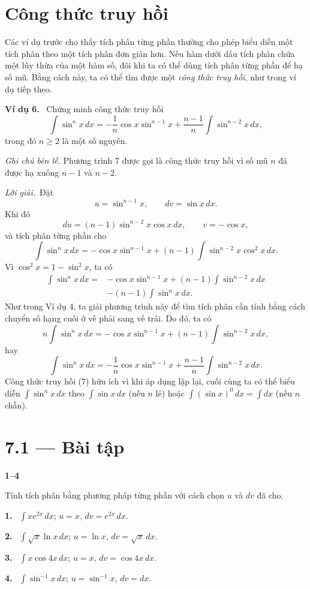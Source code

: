 \documentclass[12pt,a4paper]{article}
\newcommand{\ex}[1]{\par\medskip\noindent\textbf{Ví dụ #1.}\ }
\newcommand{\sol}{\par\nopagebreak[4]\noindent\textit{Lời giải.}\ }
\newcommand{\bt}[1]{\par\smallskip\Needspace{5\baselineskip}\noindent\textbf{#1.}\ }
\newcommand{\group}[1]{\par\Needspace{11\baselineskip}\medskip\noindent\textbf{#1}\par\nopagebreak[4]}
\begin{document}
\section*{Công thức truy hồi}
Các ví dụ trước cho thấy tích phân từng phần thường cho phép biểu diễn một tích phân theo một tích phân đơn giản hơn. Nếu hàm dưới dấu tích phân chứa một lũy thừa của một hàm số, đôi khi ta có thể dùng tích phân từng phần để hạ số mũ. Bằng cách này, ta có thể tìm được một \textit{công thức truy hồi}, như trong ví dụ tiếp theo.

\ex{6} Chứng minh công thức truy hồi
\begin{equation}\int\sin^n x\,dx=-\frac1n\cos x\sin^{n-1}x+\frac{n-1}{n}\int\sin^{n-2}x\,dx,\tag{7}\end{equation}
trong đó $n\ge2$ là một số nguyên.

\textit{Ghi chú bên lề.} Phương trình 7 được gọi là công thức truy hồi vì số mũ $n$ đã được hạ xuống $n-1$ và $n-2$.
\sol Đặt
\[u=\sin^{n-1}x,\qquad dv=\sin x\,dx.\]
Khi đó
\[du=(n-1)\sin^{n-2}x\cos x\,dx,\qquad v=-\cos x,\]
và tích phân từng phần cho
\[\int\sin^n x\,dx=-\cos x\sin^{n-1}x+(n-1)\int\sin^{n-2}x\cos^2x\,dx.\]
Vì $\cos^2x=1-\sin^2x$, ta có
\begin{align*}
\int\sin^n x\,dx={}&-\cos x\sin^{n-1}x+(n-1)\int\sin^{n-2}x\,dx\\
&-(n-1)\int\sin^n x\,dx.
\end{align*}
Như trong Ví dụ 4, ta giải phương trình này để tìm tích phân cần tính bằng cách chuyển số hạng cuối ở vế phải sang vế trái. Do đó, ta có
\[n\int\sin^n x\,dx=-\cos x\sin^{n-1}x+(n-1)\int\sin^{n-2}x\,dx,\]
hay
\[\int\sin^n x\,dx=-\frac1n\cos x\sin^{n-1}x+\frac{n-1}{n}\int\sin^{n-2}x\,dx.\]
Công thức truy hồi (7) hữu ích vì khi áp dụng lặp lại, cuối cùng ta có thể biểu diễn $\int\sin^n x\,dx$ theo $\int\sin x\,dx$ (nếu $n$ lẻ) hoặc $\int(\sin x)^0\,dx=\int dx$ (nếu $n$ chẵn).

\clearpage
\section*{7.1 — Bài tập}
\group{1–4} Tính tích phân bằng phương pháp từng phần với cách chọn $u$ và $dv$ đã cho.
\bt{1} $\displaystyle\int xe^{2x}\,dx$; $u=x$, $dv=e^{2x}\,dx$.
\bt{2} $\displaystyle\int\sqrt{x}\ln x\,dx$; $u=\ln x$, $dv=\sqrt{x}\,dx$.
\bt{3} $\displaystyle\int x\cos4x\,dx$; $u=x$, $dv=\cos4x\,dx$.
\bt{4} $\displaystyle\int\sin^{-1}x\,dx$; $u=\sin^{-1}x$, $dv=dx$.
\end{document}
